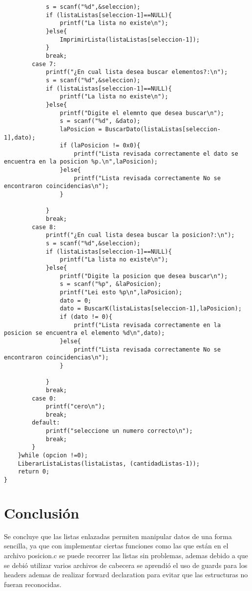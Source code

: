 \begin{verbatim}
            s = scanf("%d",&seleccion);
            if (listaListas[seleccion-1]==NULL){
                printf("La lista no existe\n");
            }else{
                ImprimirLista(listaListas[seleccion-1]);
            }
            break;
        case 7:
            printf("¿En cual lista desea buscar elementos?:\n");
            s = scanf("%d",&seleccion);
            if (listaListas[seleccion-1]==NULL){
                printf("La lista no existe\n");
            }else{
                printf("Digite el elemnto que desea buscar\n");
                s = scanf("%d", &dato);
                laPosicion = BuscarDato(listaListas[seleccion-1],dato);
                if (laPosicion != 0x0){
                    printf("Lista revisada correctamente el dato se encuentra en la posicion %p.\n",laPosicion);
                }else{
                    printf("Lista revisada correctamente No se encontraron coincidencias\n");
                }
                
            }
            break;
        case 8:
            printf("¿En cual lista desea buscar la posicion?:\n");
            s = scanf("%d",&seleccion);
            if (listaListas[seleccion-1]==NULL){
                printf("La lista no existe\n");
            }else{
                printf("Digite la posicion que desea buscar\n");
                s = scanf("%p", &laPosicion);
                printf("Lei esto %p\n",laPosicion);
                dato = 0;
                dato = BuscarK(listaListas[seleccion-1],laPosicion);
                if (dato != 0){
                    printf("Lista revisada correctamente en la posicion se encuentra el elemento %d\n",dato);
                }else{
                    printf("Lista revisada correctamente No se encontraron coincidencias\n");
                }
                
            }
            break;
        case 0:
            printf("cero\n");
            break;
        default:
            printf("seleccione un numero correcto\n");
            break;
        }
    }while (opcion !=0);
    LiberarListaListas(listaListas, (cantidadListas-1));
    return 0;
}
\end{verbatim}


%



\newpage	
\section{Conclusión}
Se concluye que las listas enlazadas permiten manipular datos de una forma sencilla, ya que con implementar ciertas funciones como las que están en el archivo posicion.c se puede recorrer las listas sin problemas, ademas debido a que se debió utilizar varios archivos de cabecera se aprendió el uso de guards para los headers ademas de realizar forward declaration para evitar que las estructuras no fueran reconocidas.


